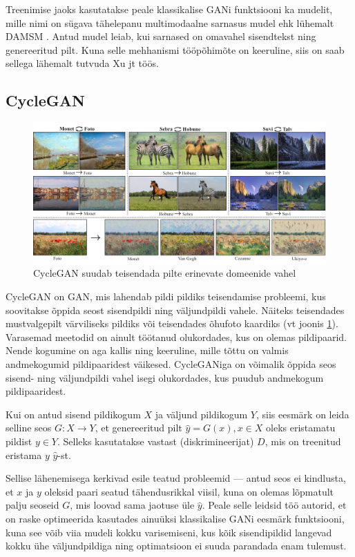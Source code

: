\documentclass{vilgym}
\begin{document}
	Treenimise jaoks kasutatakse peale klassikalise GANi funktsiooni ka mudelit, mille nimi on sügava tähelepanu multimodaalne sarnasus mudel ehk lühemalt DAMSM . Antud mudel leiab, kui sarnased on omavahel sisendtekst ning genereeritud pilt. Kuna selle mehhanismi tööpõhimõte on keeruline, siis on saab sellega lähemalt tutvuda Xu jt töös. \parencite{attngan}

	\subsection{CycleGAN}
	\begin{figure}
		\centering
			\includegraphics[width=\linewidth]{images/cyclegan_est.png}
			\caption{CycleGAN suudab teisendada pilte erinevate domeenide vahel \parencite{cyclegan}}
			\label{fig:cyclegan}
	\end{figure}

	CycleGAN on GAN, mis lahendab pildi pildiks teisendamise probleemi, kus soovitakse õppida seost sisendpildi ning väljundpildi vahele. Näiteks teisendades mustvalgepilt värviliseks pildiks või teisendades õhufoto kaardiks (vt joonis \ref{fig:cyclegan}). Varasemad meetodid on ainult töötanud olukordades, kus on olemas pildipaarid. Nende kogumine on aga kallis ning keeruline, mille tõttu on valmis andmekogumid pildipaaridest väikesed. CycleGANiga on võimalik õppida seos sisend- ning väljundpildi vahel isegi olukordades, kus puudub andmekogum pildipaaridest. 

	Kui on antud sisend pildikogum $ X $ ja väljund pildikogum $ Y $, siis eesmärk on leida selline seos $ G: X \rightarrow Y $, et genereeritud pilt $ \hat{y} = G(x), x \in X $ oleks eristamatu pildist $ y \in Y $. Selleks kasutatakse vastast (diskrimineerijat) $ D $, mis on treenitud eristama $ y $ $ \hat{y} $-st. 

	Sellise lähenemisega kerkivad esile teatud probleemid --- antud seos ei kindlusta, et $ x $ ja $ y $ oleksid paari seatud tähendusrikkal viisil, kuna on olemas lõpmatult palju seoseid $ G $, mis loovad sama jaotuse üle $ \hat{y} $. Peale selle leidsid töö autorid, et on raske optimeerida kasutades ainuüksi klassikalise GANi eesmärk funktsiooni, kuna see võib viia mudeli kokku varisemiseni, kus kõik sisendipildid langevad kokku ühe väljundpildiga ning optimatsioon ei suuda parandada enam tulemust.
\end{document}
